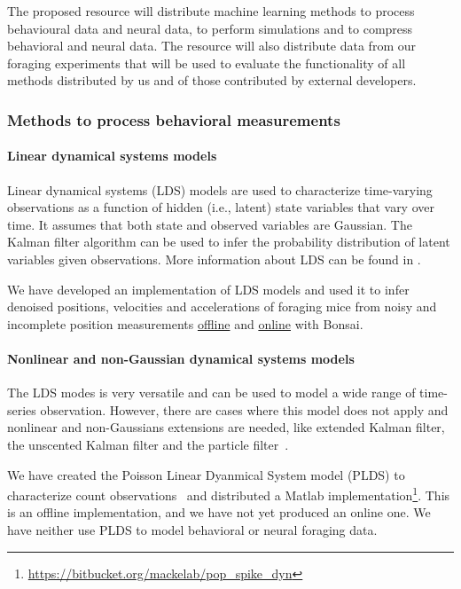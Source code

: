 
The proposed resource will distribute machine learning methods to process
behavioural data and neural data, to perform simulations and to compress
behavioral and neural data. The resource will also distribute data from our
foraging experiments that will be used to evaluate the functionality of all
methods distributed by us and of those contributed by external developers.

\subsubsection{Methods to process behavioral measurements}

\paragraph{Linear dynamical systems models}

Linear dynamical systems (LDS) models are used to characterize time-varying
observations as a function of hidden (i.e., latent) state variables that vary
over time. It assumes that both state and observed variables are Gaussian. The
Kalman filter algorithm can be used to infer the probability distribution of
latent variables given observations. More information about LDS can be found in
\citep[][part I]{durbinAndKoopman12}.

We have developed an implementation of LDS models and used it to infer denoised
positions, velocities and accelerations of foraging mice from noisy and
incomplete position measurements
\href{https://joacorapela.github.io/lds\_python/auto\_examples/tracking/plotFilterFWGMouseTrajectoryManualVsLearnedParams.html}{offline}
and
\href{https://bonsai-rx.org/machinelearning/examples/examples/LinearDynamicalSystems/Kinematics/ForagingMouse/README.html}{online}
with Bonsai.

\paragraph{Nonlinear and non-Gaussian dynamical systems models}

The LDS modes is very versatile and can be used to model a wide range of
time-series observation. However, there are cases where this model does not
apply and nonlinear and non-Gaussians extensions are needed, like extended
Kalman filter, the unscented Kalman filter and the particle
filter~\citep[][part II]{durbinAndKoopman12}.

We have created the Poisson Linear Dyanmical System model (PLDS) to characterize count
observations~\citep{mackeEtAl15} and distributed a Matlab
implementation\footnote{\url{https://bitbucket.org/mackelab/pop\_spike\_dyn}}.
This is an offline implementation, and we have not yet produced an online one.
We have neither use PLDS to model behavioral or neural foraging data.

